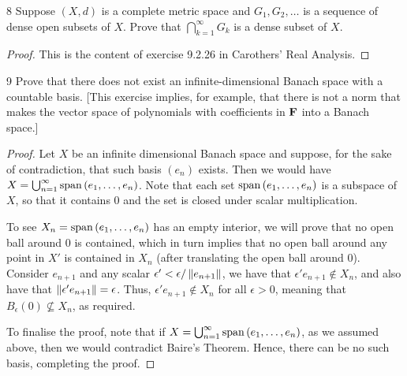 \begin{exercise}{8}
Suppose $(X, d)$ is a complete metric space and $G_1, G_2, \dots$ is a sequence of dense open subsets of $X$.
Prove that $\bigcap_{k=1}^\infty G_k$ is a dense subset of $X$.
\end{exercise}
\begin{proof}
This is the content of exercise 9.2.26 in Carothers' Real Analysis.
\end{proof} 

\begin{exercise}{9}
Prove that there does not exist an infinite-dimensional Banach space with a countable basis.
[This exercise implies, for example, that there is not a norm that makes the vector space of polynomials with coefficients in $\mathbf{F}$ into a Banach space.]
\end{exercise}
\begin{proof}
Let $X$ be an infinite dimensional Banach space and suppose, for the sake of contradiction, that such basis $(e_n)$ exists.
Then we would have $X = \bigcup_{n=1}^\infty \operatorname*{span}{(e_1, \dots, e_n)}$.
Note that each set $\operatorname*{span}{(e_1, \dots, e_n)}$ is a subspace of $X$, so that it contains 0 and the set is closed under scalar multiplication.

To see $X_n = \operatorname*{span}{(e_1, \dots, e_n)}$ has an empty interior, we will prove that no open ball around 0 is contained, which in turn implies that no open ball around any point in $X'$ is contained in $X_n$ (after translating the open ball around 0).
Consider $e_{n+1}$ and any scalar $\epsilon' < \epsilon/\left\lVert e_{n+1}\right\rVert$, we have that $\epsilon' e_{n+1} \notin X_n$, and also have that $\left\lVert \epsilon' e_{n+1}\right\rVert = \epsilon$.
Thus, $\epsilon' e_{n+1} \notin X_n$ for all $\epsilon > 0$, meaning that $B_\epsilon(0) \not\subseteq X_n$, as required.

To finalise the proof, note that if $X = \bigcup_{n=1}^\infty \operatorname*{span}{(e_1, \dots, e_n)}$, as we assumed above, then we would contradict Baire's Theorem.
Hence, there can be no such basis, completing the proof.
\end{proof} 

